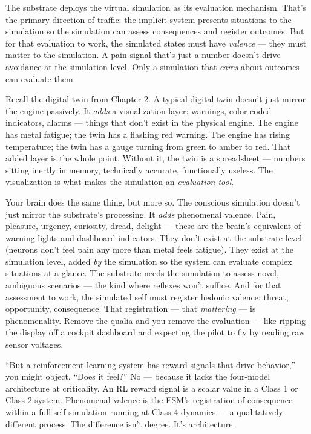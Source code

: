 \documentclass[11pt, twoside, openright]{book}
\begin{document}
The substrate deploys the virtual simulation as its evaluation mechanism. That's the primary direction of traffic: the implicit system presents situations to the simulation so the simulation can assess consequences and register outcomes. But for that evaluation to work, the simulated states must have \textit{valence} --- they must matter to the simulation. A pain signal that's just a number doesn't drive avoidance at the simulation level. Only a simulation that \textit{cares} about outcomes can evaluate them.

Recall the digital twin from Chapter 2. A typical digital twin doesn't just mirror the engine passively. It \textit{adds} a visualization layer: warnings, color-coded indicators, alarms --- things that don't exist in the physical engine. The engine has metal fatigue; the twin has a flashing red warning. The engine has rising temperature; the twin has a gauge turning from green to amber to red. That added layer is the whole point. Without it, the twin is a spreadsheet --- numbers sitting inertly in memory, technically accurate, functionally useless. The visualization is what makes the simulation an \textit{evaluation tool}.

Your brain does the same thing, but more so. The conscious simulation doesn't just mirror the substrate's processing. It \textit{adds} phenomenal valence. Pain, pleasure, urgency, curiosity, dread, delight --- these are the brain's equivalent of warning lights and dashboard indicators. They don't exist at the substrate level (neurons don't feel pain any more than metal feels fatigue). They exist at the simulation level, added \textit{by} the simulation so the system can evaluate complex situations at a glance. The substrate needs the simulation to assess novel, ambiguous scenarios --- the kind where reflexes won't suffice. And for that assessment to work, the simulated self must register hedonic valence: threat, opportunity, consequence. That registration --- that \textit{mattering} --- is phenomenality. Remove the qualia and you remove the evaluation --- like ripping the display off a cockpit dashboard and expecting the pilot to fly by reading raw sensor voltages.

``But a reinforcement learning system has reward signals that drive behavior,'' you might object. ``Does it feel?'' No --- because it lacks the four-model architecture at criticality. An RL reward signal is a scalar value in a Class 1 or Class 2 system. Phenomenal valence is the ESM's registration of consequence within a full self-simulation running at Class 4 dynamics --- a qualitatively different process. The difference isn't degree. It's architecture.
\end{document}
